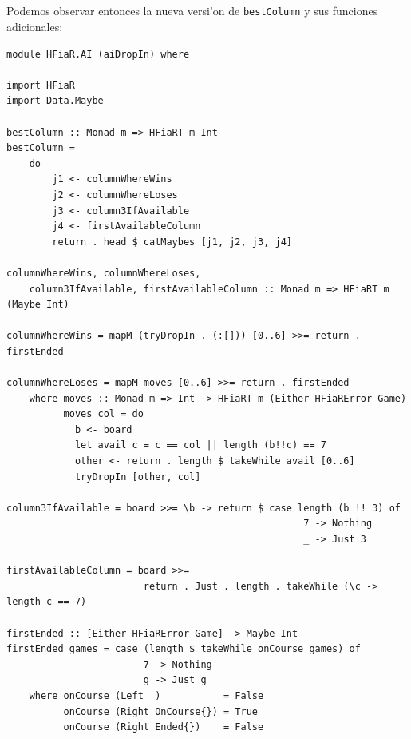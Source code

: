 \documentclass[a4paper]{article}
\begin{document}
\newpage
\subparagraph{}Podemos observar entonces la nueva versi'on de \texttt{bestColumn} y sus funciones adicionales:
\begin{center}\begin{lstlisting}
module HFiaR.AI (aiDropIn) where

import HFiaR
import Data.Maybe

bestColumn :: Monad m => HFiaRT m Int
bestColumn =
    do
        j1 <- columnWhereWins
        j2 <- columnWhereLoses
        j3 <- column3IfAvailable
        j4 <- firstAvailableColumn
        return . head $ catMaybes [j1, j2, j3, j4]

columnWhereWins, columnWhereLoses,
    column3IfAvailable, firstAvailableColumn :: Monad m => HFiaRT m (Maybe Int)

columnWhereWins = mapM (tryDropIn . (:[])) [0..6] >>= return . firstEnded

columnWhereLoses = mapM moves [0..6] >>= return . firstEnded
    where moves :: Monad m => Int -> HFiaRT m (Either HFiaRError Game)
          moves col = do
            b <- board
            let avail c = c == col || length (b!!c) == 7
            other <- return . length $ takeWhile avail [0..6]
            tryDropIn [other, col]

column3IfAvailable = board >>= \b -> return $ case length (b !! 3) of
                                                    7 -> Nothing
                                                    _ -> Just 3

firstAvailableColumn = board >>=
						return . Just . length . takeWhile (\c -> length c == 7)

firstEnded :: [Either HFiaRError Game] -> Maybe Int
firstEnded games = case (length $ takeWhile onCourse games) of
                        7 -> Nothing
                        g -> Just g
    where onCourse (Left _)           = False
          onCourse (Right OnCourse{}) = True
          onCourse (Right Ended{})    = False
\end{lstlisting}\end{center}
\end{document}
